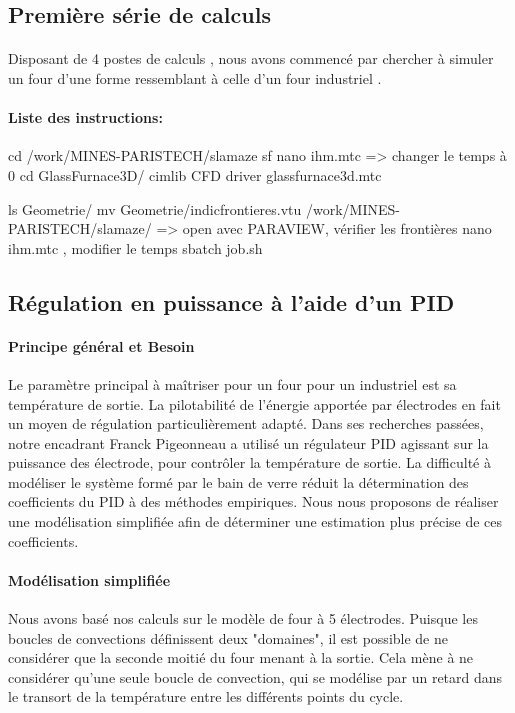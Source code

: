 \documentclass[12pt, a4paper, french, BCOR = 0pt, DIV = 10]{scrartcl}
\begin{document}
	
	\subsection{Première série de calculs}
	\paragraph{}
	 Disposant de 4 postes de calculs , nous avons commencé par chercher à simuler un four  d'une forme ressemblant à celle d'un four industriel .
	 
	 \paragraph{Liste des instructions:}
	 cd /work/MINES-PARISTECH/slamaze
	 sf
	 nano ihm.mtc => changer le temps à 0
	 cd GlassFurnace3D/
	 cimlib CFD driver glassfurnace3d.mtc
	 
	 ls Geometrie/
	 mv Geometrie/indicfrontieres.vtu /work/MINES-PARISTECH/slamaze/ => open avec PARAVIEW, vérifier les frontières
	 nano ihm.mtc , modifier le temps
	 sbatch job.sh

     \subsection{Régulation en puissance à l'aide d'un PID}
     \paragraph{Principe général et Besoin}

     Le paramètre principal à maîtriser pour un four pour un industriel est sa température de sortie. La pilotabilité de l'énergie apportée par électrodes en fait un moyen de régulation particulièrement adapté. Dans ses recherches passées, notre encadrant Franck Pigeonneau a utilisé un régulateur PID agissant sur la puissance des électrode, pour contrôler la température de sortie. La difficulté à modéliser le système formé par le bain de verre réduit la détermination des coefficients du PID à des méthodes empiriques. Nous nous proposons de réaliser une modélisation simplifiée afin de déterminer une estimation plus précise de ces coefficients.

     \paragraph{Modélisation simplifiée}
     Nous avons basé nos calculs sur le modèle de four à 5 électrodes. Puisque les boucles de convections définissent deux "domaines", il est possible de ne considérer que la seconde moitié du four menant à la sortie. Cela mène à ne considérer qu'une seule boucle de convection, qui se modélise par un retard dans le transort de la température entre les différents points du cycle.
\end{document}

